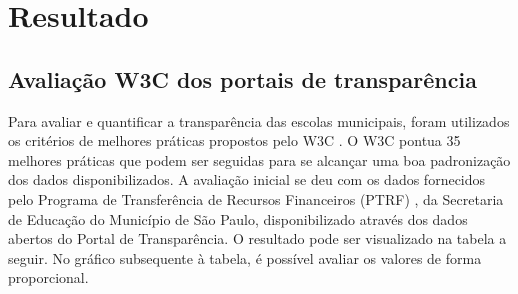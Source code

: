 \chapter{Resultado}

\section{Avaliação W3C dos portais de transparência}

Para avaliar e quantificar a transparência das escolas municipais, foram utilizados os critérios de melhores práticas propostos pelo W3C \cite{W3C}. O W3C pontua 35 melhores práticas \cite{W3CSUMMARY} que podem ser seguidas para se alcançar uma boa padronização dos dados disponibilizados. A avaliação inicial se deu com os dados fornecidos pelo Programa de Transferência de Recursos Financeiros (PTRF) \cite{SP}, da Secretaria de Educação do Município de São Paulo, disponibilizado através dos dados abertos do Portal de Transparência. O resultado pode ser visualizado na tabela a seguir. No gráfico subsequente à tabela, é possível avaliar os valores de forma proporcional.

